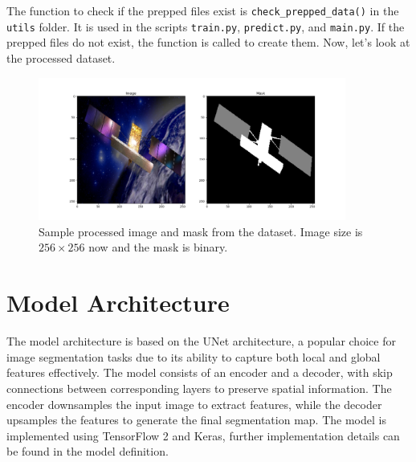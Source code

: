 \documentclass{article}
\begin{document}
The function to check if the prepped files exist is \texttt{check\_prepped\_data()} in the \texttt{utils} folder.
It is used in the scripts \texttt{train.py}, \texttt{predict.py}, and \texttt{main.py}. If the prepped files 
do not exist, the function is called to create them. Now, let's look at the processed dataset.

\begin{figure}[h]
    \centering
    \includegraphics[width=0.9\textwidth]{../images/processed_input_sample.png}
    \caption{Sample processed image and mask from the dataset. Image size is $256 \times 256$ now and the mask is binary.}
    \label{fig:preprocessed_dataset}
\end{figure}


\section{Model Architecture}
The model architecture is based on the UNet architecture, a popular choice for image segmentation tasks
due to its ability to capture both local and global features effectively. The model consists of an encoder
and a decoder, with skip connections between corresponding layers to preserve spatial information. The
encoder downsamples the input image to extract features, while the decoder upsamples the features to
generate the final segmentation map. The model is implemented using TensorFlow 2 and Keras, further
implementation details can be found in the model definition.
\end{document}
